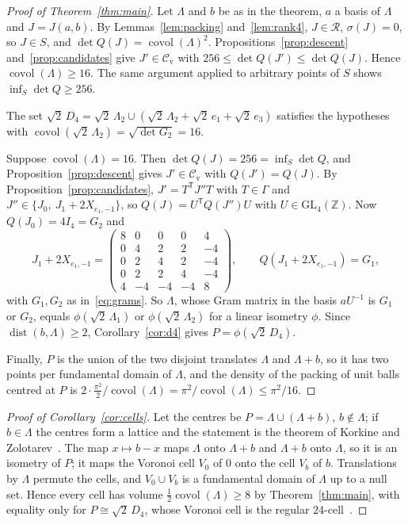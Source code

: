 \documentclass[11pt,reqno]{amsart}
\renewcommand{\_}{\origunderscore\allowbreak}
\numberwithin{equation}{section}
\theoremstyle{plain}
\theoremstyle{definition}
\theoremstyle{remark}
\newcommand{\Z}{\mathbb{Z}}
\newcommand{\Rk}{\mathcal{R}}
\newcommand{\covol}{\operatorname{covol}}
\newcommand{\dist}{\operatorname{dist}}
\newcommand{\GL}{\mathrm{GL}}
\newcommand{\cand}{\mathcal{C}_{\mathrm{v}}}
\begin{document}
\begin{proof}[Proof of Theorem~\ref{thm:main}]
Let $\Lambda$ and $b$ be as in the theorem, $a$ a basis of $\Lambda$ and $J=J(a,b)$. By Lemmas~\ref{lem:packing} and~\ref{lem:rank4}, $J\in\Rk$, $\sigma(J)=0$, so $J\in S$, and $\det Q(J)=\covol(\Lambda)^2$. Propositions~\ref{prop:descent} and~\ref{prop:candidates} give $J'\in\cand$ with $256\le\det Q(J')\le\det Q(J)$. Hence $\covol(\Lambda)\ge16$. The same argument applied to arbitrary points of $S$ shows $\inf_S\det Q\ge256$.

The set $\sqrt2\,D_4=\sqrt2\,\Lambda_2\cup(\sqrt2\,\Lambda_2+\sqrt2\,e_1+\sqrt2\,e_3)$ satisfies the hypotheses with $\covol(\sqrt2\,\Lambda_2)=\sqrt{\det G_2}=16$.

Suppose $\covol(\Lambda)=16$. Then $\det Q(J)=256=\inf_S\det Q$, and Proposition~\ref{prop:descent} gives $J'\in\cand$ with $Q(J')=Q(J)$. By Proposition~\ref{prop:candidates}, $J'=T^{\mathsf T}J''T$ with $T\in\Gamma$ and $J''\in\{J_0,\ J_1+2X_{e_1,-1}\}$, so $Q(J)=U^{\mathsf T}Q(J'')U$ with $U\in\GL_4(\Z)$. Now $Q(J_0)=4I_4=G_2$ and
\[
J_1+2X_{e_1,-1}=\begin{pmatrix}8&0&0&0&4\\0&4&2&2&-4\\0&2&4&2&-4\\0&2&2&4&-4\\4&-4&-4&-4&8\end{pmatrix},\qquad Q(J_1+2X_{e_1,-1})=G_1,
\]
with $G_1,G_2$ as in~\eqref{eq:grams}. So $\Lambda$, whose Gram matrix in the basis $aU^{-1}$ is $G_1$ or $G_2$, equals $\phi(\sqrt2\,\Lambda_1)$ or $\phi(\sqrt2\,\Lambda_2)$ for a linear isometry $\phi$. Since $\dist(b,\Lambda)\ge2$, Corollary~\ref{cor:d4} gives $P=\phi(\sqrt2\,D_4)$.

Finally, $P$ is the union of the two disjoint translates $\Lambda$ and $\Lambda+b$, so it has two points per fundamental domain of $\Lambda$, and the density of the packing of unit balls centred at $P$ is $2\cdot\frac{\pi^2}{2}/\covol(\Lambda)=\pi^2/\covol(\Lambda)\le\pi^2/16$.
\end{proof}

\begin{proof}[Proof of Corollary~\ref{cor:cells}]
Let the centres be $P=\Lambda\cup(\Lambda+b)$, $b\notin\Lambda$; if $b\in\Lambda$ the centres form a lattice and the statement is the theorem of Korkine and Zolotarev~\cite{KZ1877}. The map $x\mapsto b-x$ maps $\Lambda$ onto $\Lambda+b$ and $\Lambda+b$ onto $\Lambda$, so it is an isometry of $P$; it maps the Voronoi cell $V_0$ of $0$ onto the cell $V_b$ of $b$. Translations by $\Lambda$ permute the cells, and $V_0\cup V_b$ is a fundamental domain of $\Lambda$ up to a null set. Hence every cell has volume $\frac12\covol(\Lambda)\ge8$ by Theorem~\ref{thm:main}, with equality only for $P\cong\sqrt2\,D_4$, whose Voronoi cell is the regular $24$-cell~\cite[Ch.~21]{CS1988}.
\end{proof}
\end{document}
